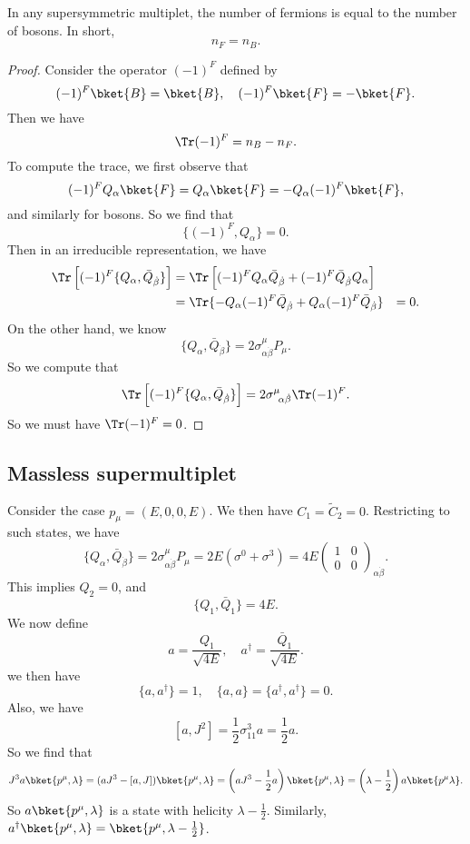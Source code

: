 \documentclass[a4paper]{article}
\begin{document}
\begin{prop}
  In any supersymmetric multiplet, the number of fermions is equal to the number of bosons. In short,
  \[
    n_F = n_B.
  \]
\end{prop}

\begin{proof}
  Consider the operator $(-1)^F$ defined by
  \[
    (-1)^F \bket{B} = \bket{B},\quad (-1)^F \bket{F} = -\bket{F}.
  \]
  Then we have
  \[
    \Tr (-1)^F = n_B - n_F.
  \]
  To compute the trace, we first observe that
  \[
    (-1)^F Q_\alpha \bket{F} = Q_\alpha \bket{F} = - Q_\alpha(-1)^F \bket{F},
  \]
  and similarly for bosons. So we find that
  \[
    \{(-1)^F, Q_\alpha\} = 0.
  \]
  Then in an irreducible representation, we have
  \begin{align*}
    \Tr \left[(-1)^F \{Q_\alpha, \bar{Q}_{\dot{\beta}}\}\right] &= \Tr \left[(-1)^F Q_\alpha \bar{Q}_{\dot{\beta}} + (-1)^F \bar{Q}_{\dot{\beta}} Q_\alpha\right]\\
    &= \Tr\{-Q_\alpha(-1)^F \bar{Q}_{\dot{\beta}} + Q_\alpha (-1)^F \bar{Q}_{\dot{\beta}}\}
    &= 0.
  \end{align*}
  On the other hand, we know
  \[
    \{Q_\alpha,\bar{Q}_{\dot{\beta}}\} = 2 \sigma^\mu_{\alpha \dot{\beta}} P_\mu.
  \]
  So we compute that
  \[
    \Tr \left[(-1)^F \{Q_\alpha, \bar{Q}_{\dot{\beta}}\}\right] = 2 \sigma^\mu\!_{\alpha\dot{\beta}} \Tr (-1)^F.
  \]
  So we must have $\Tr (-1)^F = 0$.
\end{proof}

\subsection{Massless supermultiplet}
Consider the case $p_\mu = (E, 0, 0, E)$. We then have $C_1 = \tilde{C}_2 = 0$. Restricting to such states, we have
\[
  \{Q_\alpha, \bar{Q}_{\dot{\beta}}\} = 2 \sigma^\mu_{\alpha \dot{\beta}} P_\mu = 2 E (\sigma^0 + \sigma^3) = 4E
  \begin{pmatrix}
    1 & 0\\
    0 & 0
  \end{pmatrix}_{\alpha \dot{\beta}}.
\]
This implies $Q_2 = 0$, and
\[
  \{Q_1, \bar{Q}_1\} = 4E.
\]
We now define
\[
  a = \frac{Q_1}{\sqrt{4E}},\quad a^\dagger = \frac{\bar{Q}_1}{\sqrt{4E}}.
\]
we then have
\[
  \{a, a^\dagger\} = 1,\quad \{a, a\} = \{a^\dagger, a^\dagger\} = 0.
\]
Also, we have
\[
  [a, J^2] = \frac{1}{2} \sigma_{11}^3 a = \frac{1}{2}a.
\]
So we find that
\[
  J^3a \bket{p^\mu, \lambda} = (aJ^3 - [a ,J])\bket{p^\mu, \lambda} = \left(aJ^3 - \frac{1}{2} a\right) \bket{p^\mu, \lambda} = \left(\lambda - \frac{1}{2}\right) a \bket{p^\mu \lambda}.
\]
So $a \bket{p^\mu, \lambda}$ is a state with helicity $\lambda - \frac{1}{2}$. Similarly, $a^\dagger \bket{p^\mu, \lambda} = \bket{p^\mu, \lambda - \frac{1}{2}}$.
\end{document}
